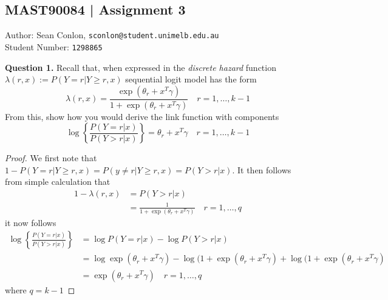 \documentclass{article}
\newcommand\questionbox[1]{%
  \begin{Qbox}#1\end{Qbox}}
\begin{document}
\subsection*{MAST90084 | Assignment 3}
Author: Sean Conlon, \texttt{sconlon@student.unimelb.edu.au} \\
Student Number: \texttt{1298865}

\vspace{10pt}
\questionbox{\textbf{Question 1.} Recall that, when expressed in the \textit{discrete hazard} function $\lambda(r, x) := P(Y = r | Y\geq r, x)$ sequential logit model has the form
$$\lambda(r, x) = \frac{\exp(\theta_r + x^T\gamma)}{1 + \exp(\theta_r + x^T\gamma)} \quad r=1,\dots,k-1$$
From this, show how you would derive the link function with components
$$\log\left\{ \frac{P(Y = r |x)}{P(Y >r|x)}\right\}=\theta_r + x^T\gamma \quad r=1,\dots,k-1$$
}
\begin{proof}
    We first note that $1 - P(Y = r | Y\geq r, x) = P(y \neq r | Y\geq r, x) = P(Y > r | x)$. It then follows from simple calculation that 
    \begin{align*}
        1 - \lambda(r, x) &= P(Y > r | x)  \\
        &= \frac{1}{1 + \exp(\theta_r + x^T\gamma)} \quad r=1,\dots,q
    \end{align*}
    it now follows 
    \begin{align*}
        \log\left\{ \frac{P(Y = r |x)}{P(Y >r|x)}\right\} &= \log P(Y = r |x) - \log P(Y >r|x) \\
        &= \log \exp(\theta_r + x^T\gamma) - \log(1+\exp(\theta_r + x^T\gamma) + \log(1+\exp(\theta_r + x^T\gamma) \\
        &=  \exp(\theta_r + x^T\gamma) \quad r =1,\dots,q
    \end{align*}
    where $q = k-1$
\end{proof}
\end{document}
